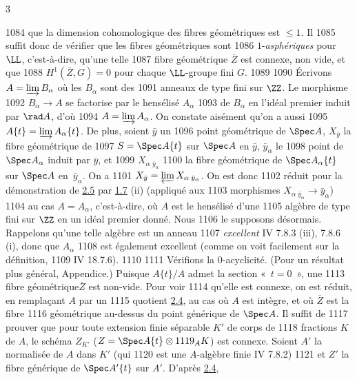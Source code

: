 3	\documentclass[10pt]{../fichiers-configuration-latex/smfart}
\begin{document}
  1084	que la dimension cohomologique des fibres géométriques est $\leq 1$. Il
  1085	suffit donc de vérifier que les fibres géométriques sont
  1086	$1$-\emph{asphériques} pour $\LL$, c'est-à-dire, qu'une telle
  1087	fibre géométrique $\bar{Z}$ est connexe, non vide, et que
  1088	$H^{1}(\bar{Z},G)=0$ pour chaque $\LL$-groupe fini $G$.
  1089	
  1090	Écrivons $A=\varinjlim B_{\alpha}$ où les $B_{\alpha}$ sont des
  1091	anneaux de type fini sur $\ZZ$. Le morphisme
  1092	$B_{\alpha}\rightarrow A$ se factorise par le hensélisé $A_{\alpha}$
  1093	de $B_{\alpha}$ en l'idéal premier induit par $\rad A$, d'où
  1094	$A=\varinjlim A_{\alpha}$. On constate aisément qu'on a aussi
  1095	$A\{t\}=\varinjlim A_{\alpha}\{t\}$. De plus, soient $\bar{y}$ un
  1096	point géométrique de $\Spec A$, $X_{\bar{y}}$ la fibre géométrique de
  1097	$S=\Spec A\{t\}$ sur $\Spec A$ en $\bar{y}$, $\bar{y}_{\alpha}$ le
  1098	point de $\Spec A_{\alpha}$ induit par $\bar{y}$, et
  1099	$X_{\alpha}\,_{\bar{y}_{\alpha}}$ %
  1100	la fibre géométrique de $\Spec A_{\alpha}\{t\}$ sur $\Spec A$ en~$\bar{y}_{\alpha}$. On a
  1101	$X_{\bar{y}}=\varprojlim {X_{\alpha}}\,_{\bar{y}_{\alpha}}$. On est donc
  1102	réduit pour la démonstration de \hyperref[XV.lem2.5]{2.5} par \hyperref[XV.def1.7]{1.7} (ii) (appliqué aux
  1103	morphismes $X_{\alpha}\,_{\bar{y}_{\alpha}}\rightarrow \bar{y}_{\alpha}$)
  1104	au cas $A=A_{\alpha}$, c'est-à-dire, où $A$ est le hensélisé d'une
  1105	algèbre de type fini sur $\ZZ$ en un idéal premier donné. Nous
  1106	le supposons désormais. Rappelons qu'une telle algèbre est un anneau
  1107	\emph{excellent} \sisi{(}{}\EGA IV 7.8.3 (iii), 7.8.6 (i)\sisi{)}{}, donc que $A_{\alpha}$
  1108	est également excellent (comme on voit facilement sur la définition,
  1109	\cf \EGA IV 18.7.6).
  1110	
  1111	Vérifions la $0$-acyclicité. (Pour un résultat plus général, 	Appendice.) Puisque $A\{t\}/A$ admet la section « $t=0$ », une
  1113	fibre géométrique\pageoriginale $\bar{Z}$ est non-vide. Pour voir
  1114	qu'elle est connexe, on est réduit, en remplaçant $A$ par un
  1115	quotient \sisi{(}{}\hyperref[XV.cor2.4]{2.4}\sisi{)}{}, au cas où $A$ est intègre, et où $\bar{Z}$ est la fibre
  1116	géométrique au-dessus du point générique de $\Spec A$. Il suffit de
  1117	prouver que pour toute extension finie séparable $K'$ de corps de
  1118	fractions $K$ de $A$, le schéma $Z_{K'}$ ($Z=\Spec A\{t\}\otimes
  1119	{}_AK$) est connexe. Soient $A'$ la normalisée de $A$ dans $K'$ (qui
  1120	est une $A$-algèbre finie \sisi{(}{}\EGA IV 7.8.2\sisi{)}{})
  1121	et $Z'$ la fibre générique de $\Spec A'\{t\}$ sur $A'$. D'après \hyperref[XV.cor2.4]{2.4},
\end{document}
